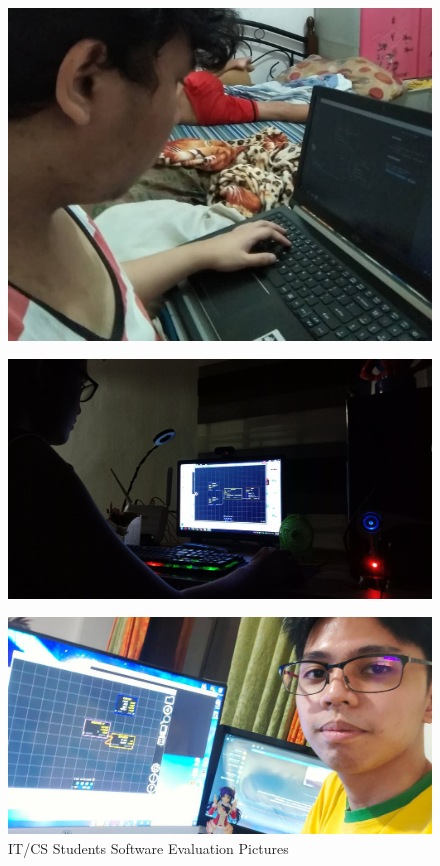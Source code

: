 \clearpage
\begin{figure}[H]
	 \centering
	 \includegraphics[width=\textwidth]{evaluators/f_ec.jpg}
\end{figure}
\begin{figure}[H]
	 \centering
	 \includegraphics[width=\textwidth]{evaluators/f_am.jpg}
\end{figure}
\begin{figure}[H]
	 \centering
	 \includegraphics[width=\textwidth]{evaluators/f_ip.jpg}
	 \caption[]{IT/CS Students Software Evaluation Pictures}
\end{figure}
